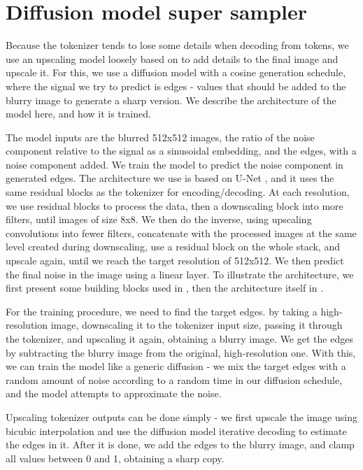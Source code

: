 \section{Diffusion model super sampler}

Because the tokenizer tends to lose some details when decoding from tokens, we use an upscaling model loosely based on \citep{diffusion_super_sampler} to add details to the final image and upscale it. For this, we use a diffusion model with a cosine generation schedule, where the signal we try to predict is edges - values that should be added to the blurry image to generate a sharp version. We describe the architecture of the model here, and how it is trained.

The model inputs are the blurred 512x512 images, the ratio of the noise component relative to the signal as a sinusoidal embedding, and the edges, with a noise component added. We train the model to predict the noise component in generated edges. The architecture we use is based on U-Net \citep{u_net}, and it uses the same residual blocks as the tokenizer for encoding/decoding. At each resolution, we use residual blocks to process the data, then a downscaling block into more filters, until images of size 8x8. We then do the inverse, using upscaling convolutions into fewer filters, concatenate with the processed images at the same level created during downscaling, use a residual block on the whole stack, and upscale again, until we reach the target resolution of 512x512. We then predict the final noise in the image using a linear layer. To illustrate the architecture, we first present some building blocks used in , then the architecture itself in .




For the training procedure, we need to find the target edges. by taking a high-resolution image, downscaling it to the tokenizer input size, passing it through the tokenizer, and upscaling it again, obtaining a blurry image. We get the edges by subtracting the blurry image from the original, high-resolution one. With this, we can train the model like a generic diffusion - we mix the target edges with a random amount of noise according to a random time in our diffusion schedule, and the model attempts to approximate the noise.

Upscaling tokenizer outputs can be done simply - we first upscale the image using bicubic interpolation and use the diffusion model iterative decoding to estimate the edges in it. After it is done, we add the edges to the blurry image, and clamp all values between 0 and 1, obtaining a sharp copy.
